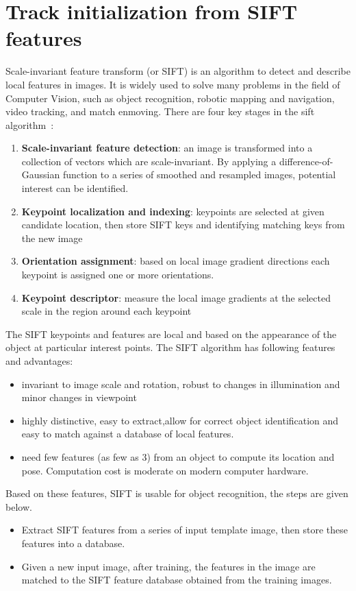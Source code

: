 \section{Track initialization from SIFT features}
\label{sec:sift_init}
Scale-invariant feature transform (or SIFT) is an algorithm to detect
and describe local features in images.  It is widely used to solve
many problems in the field of Computer Vision, such as object
recognition, robotic mapping and navigation, video tracking, and match
enmoving. There are four key stages in the sift algorithm~\cite{lowe2004distinctive}:
\begin{enumerate}
\item \textbf{Scale-invariant feature detection}: an image is transformed into
  a collection of vectors which are scale-invariant. By applying a difference-of-Gaussian
function to a series of smoothed and resampled images, potential
interest can be identified.
\item \textbf{Keypoint localization and indexing}: keypoints are selected at given
  candidate location, then store SIFT keys and identifying matching keys from the new image
\item \textbf{Orientation assignment}:  based on local image gradient
  directions each keypoint is assigned one or more orientations.
\item \textbf{Keypoint descriptor}: measure the local image gradients
  at the selected scale in the region around each keypoint
\end{enumerate}


The SIFT keypoints and features are local and based on the appearance
of the object at particular interest points. The SIFT algorithm has following
features and advantages:
\begin{itemize}
\item invariant to image scale and rotation, robust to changes in
  illumination and minor changes in viewpoint
\item highly distinctive, easy to extract,allow for correct object
  identification and easy to match against a database of local
  features. 
\item need few features (as few as 3) from an object to compute its location
  and pose. Computation cost is moderate on modern computer hardware.
\end{itemize}

Based on these features, SIFT is usable for object recognition, the
steps are given below.
\begin{itemize}
\item Extract SIFT features from a series of input template image,
  then store these features into a database.
\item Given a new input image, after training, the features in
  the image are matched to the SIFT feature database obtained from the
  training images.
\end{itemize}

